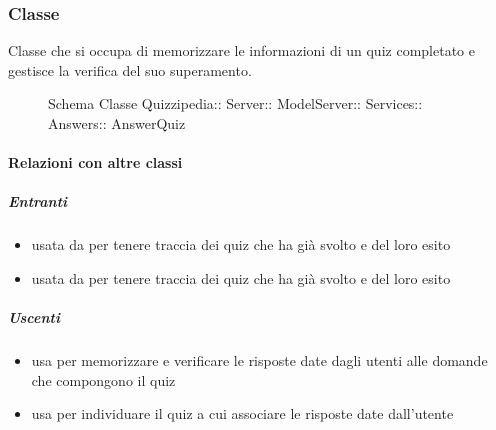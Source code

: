 \subsubsection{Classe }
Classe che si occupa di memorizzare le informazioni di un quiz completato e gestisce la verifica del suo superamento.
\begin{figure}[H]
\centering
\noindent{}
\caption[Schema Classe AnswerQuiz]{Schema Classe Quizzipedia:: Server:: ModelServer:: Services:: Answers:: AnswerQuiz}
\end{figure}
\paragraph{Relazioni con altre classi}
\subparagraph{Entranti}
\begin{itemize}
\item usata da  per tenere traccia dei quiz che ha già svolto e del loro esito
\item usata da  per tenere traccia dei quiz che ha già svolto e del loro esito
\end{itemize}
\subparagraph{Uscenti}
\begin{itemize}
\item usa  per memorizzare e verificare le risposte date dagli utenti alle domande che compongono il quiz
\item usa  per individuare il quiz a cui associare le risposte date dall'utente
\end{itemize}
